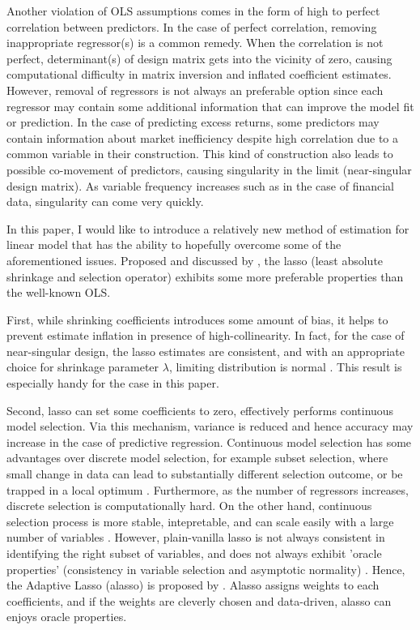 \documentclass[12pt,a4paper]{article}
\begin{document}
Another violation of OLS assumptions comes in the form of high to perfect correlation between predictors. In the case of perfect correlation, removing inappropriate regressor(s) is a common remedy. When the correlation is not perfect, determinant(s) of design matrix gets into the vicinity of zero, causing computational difficulty in matrix inversion and inflated coefficient estimates. However, removal of regressors is not always an preferable option since each regressor may contain some additional information that can improve the model fit or prediction. In the case of predicting excess returns, some predictors may contain information about market inefficiency despite high correlation due to a common variable in their construction. This kind of construction also leads to possible co-movement of predictors, causing singularity in the limit (near-singular design matrix). As variable frequency increases such as in the case of financial data, singularity can come very quickly.

In this paper, I would like to introduce a relatively new method of estimation for linear model that has the ability to hopefully overcome some of the aforementioned issues. Proposed and discussed by \cite{tibshirani1996regression}, the lasso (least absolute shrinkage and selection operator) exhibits some more preferable properties than the well-known OLS.

First, while shrinking coefficients introduces some amount of bias, it helps to prevent estimate inflation in presence of high-collinearity. In fact, for the case of near-singular design, the lasso estimates are consistent, and with an appropriate choice for shrinkage parameter $ \lambda $, limiting distribution is normal \citep{knight2000asymptotics, knight2008shrinkage}. This result is especially handy for the case in this paper.

Second, lasso can set some coefficients to zero, effectively performs continuous model selection. Via this mechanism, variance is reduced and hence accuracy may increase in the case of predictive regression. Continuous model selection has some advantages over discrete model selection, for example subset selection, where small change in data can lead to substantially different selection outcome, or be trapped in a local optimum \citep{breiman1995better}. Furthermore, as the number of regressors increases, discrete selection is computationally hard. On the other hand, continuous selection process is more stable, intepretable, and can scale easily with a large number of variables \citep{tibshirani1996regression}. However, plain-vanilla lasso is not always consistent in identifying the right subset of variables, and does not always exhibit 'oracle properties' (consistency in variable selection and asymptotic normality) \citep{meinshausen2004consistent, zou2006adaptive}. Hence, the Adaptive Lasso (alasso) is proposed by \cite{zou2006adaptive}. Alasso assigns weights to each coefficients, and if the weights are cleverly chosen and data-driven, alasso can enjoys oracle properties. 
\end{document}
